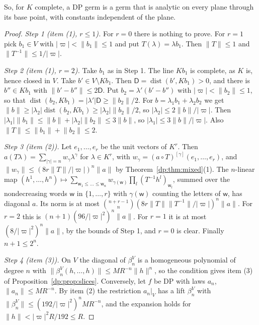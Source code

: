 \documentclass[11pt]{amsart}
\theoremstyle{definition}
\theoremstyle{remark}
\numberwithin{equation}{section}
\newcommand{\abs}[1]{\lvert #1\rvert}
\newcommand{\norm}[1]{\lVert #1\rVert}
\theoremstyle{plain}
\theoremstyle{definition}
\theoremstyle{plain}
\begin{document}
So, for $K$ complete, a DP germ is a germ that is analytic on every plane through its base point, with constants independent of the plane.

\begin{proof}
\emph{Step 1 (item (1), $r\le1$).} For $r=0$ there is nothing to prove. For $r=1$ pick $b_1\in V$ with $\abs\varpi<\norm{b_1}\le1$ and put $T(\lambda)=\lambda b_1$. Then $\norm T\le1$ and $\norm{T^{-1}}\le1/\abs\varpi$.

\emph{Step 2 (item (1), $r=2$).} Take $b_1$ as in Step 1. The line $Kb_1$ is complete, as $K$ is, hence closed in $V$. Take $b'\in V\setminus Kb_1$. Then $\mathsf D=\operatorname{dist}(b',Kb_1)>0$, and there is $b''\in Kb_1$ with $\norm{b'-b''}\le2\mathsf D$. Put $b_2=\lambda'(b'-b'')$ with $\abs\varpi<\norm{b_2}\le1$, so that $\operatorname{dist}(b_2,Kb_1)=\abs{\lambda'}\mathsf D\ge\norm{b_2}/2$. For $b=\lambda_1b_1+\lambda_2b_2$ we get $\norm b\ge\abs{\lambda_2}\operatorname{dist}(b_2,Kb_1)\ge\abs{\lambda_2}\norm{b_2}/2$, so $\abs{\lambda_2}\le2\norm b/\abs\varpi$. Then $\abs{\lambda_1}\norm{b_1}\le\norm b+\abs{\lambda_2}\norm{b_2}\le3\norm b$, so $\abs{\lambda_1}\le3\norm b/\abs\varpi$. Also $\norm T\le\norm{b_1}+\norm{b_2}\le2$.

\emph{Step 3 (item (2)).} Let $e_1,\dots,e_r$ be the unit vectors of $K^r$. Then $a(T\lambda)=\sum_{\abs\gamma=n}w_\gamma\lambda^\gamma$ for $\lambda\in K^r$, with $w_\gamma=(a\circ T)^{[\gamma]}(e_1,\dots,e_r)$, and $\norm{w_\gamma}\le(8r\norm T/\abs\varpi)^n\norm a$ by Theorem~\ref{dp:thm:mixed}(1). The $n$\nobreakdash-linear map $(h^1,\dots,h^n)\mapsto\sum_{\mathsf w_1\le\dots\le\mathsf w_n}w_{\gamma(\mathsf w)}\prod_l(T^{-1}h^l)_{\mathsf w_l}$, summed over the nondecreasing words $\mathsf w$ in $\{1,\dots,r\}$ with $\gamma(\mathsf w)$ counting the letters of $\mathsf w$, has diagonal $a$. Its norm is at most $\binom{n+r-1}n(8r\norm T\norm{T^{-1}}/\abs\varpi)^n\norm a$. For $r=2$ this is $(n+1)(96/\abs\varpi^2)^n\norm a$. For $r=1$ it is at most $(8/\abs\varpi^2)^n\norm a$, by the bounds of Step 1, and $r=0$ is clear. Finally $n+1\le2^n$.

\emph{Step 4 (item (3)).} On $V$ the diagonal of $\beta^V_n$ is a homogeneous polynomial of degree $n$ with $\norm{\beta^V_n(h,\dots,h)}\le MR^{-n}\norm h^n$, so the condition gives item (3) of Proposition~\ref{dp:prop:slices}. Conversely, let $f$ be DP with laws $a_n$, $\norm{a_n}\le MR^{-n}$. By item (2) the restriction $a_n|_V$ has a lift $\beta^V_n$ with $\norm{\beta^V_n}\le(192/\abs\varpi^2)^nMR^{-n}$, and the expansion holds for $\norm h<\abs\varpi^2R/192\le R$.
\end{proof}
\end{document}
